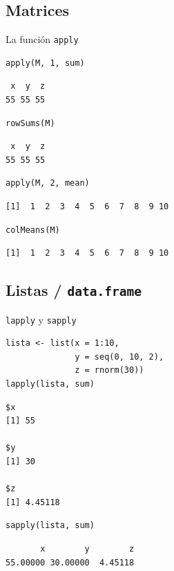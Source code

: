 \documentclass[xcolor={usenames,svgnames,dvipsnames}]{beamer}
\begin{document}
\subsection{Matrices}
\label{sec-4-1}
\begin{frame}[fragile,label=sec-4-1-1]{La función \texttt{apply}}
 \lstset{language=R,label= ,caption= ,numbers=none}
\begin{lstlisting}
apply(M, 1, sum)
\end{lstlisting}

\begin{verbatim}
 x  y  z 
55 55 55
\end{verbatim}

\lstset{language=R,label= ,caption= ,numbers=none}
\begin{lstlisting}
rowSums(M)
\end{lstlisting}

\begin{verbatim}
 x  y  z 
55 55 55
\end{verbatim}

\lstset{language=R,label= ,caption= ,numbers=none}
\begin{lstlisting}
apply(M, 2, mean)
\end{lstlisting}

\begin{verbatim}
[1]  1  2  3  4  5  6  7  8  9 10
\end{verbatim}

\lstset{language=R,label= ,caption= ,numbers=none}
\begin{lstlisting}
colMeans(M)
\end{lstlisting}

\begin{verbatim}
[1]  1  2  3  4  5  6  7  8  9 10
\end{verbatim}
\end{frame}

\subsection{Listas / \texttt{data.frame}}
\label{sec-4-2}
\begin{frame}[fragile,label=sec-4-2-1]{\texttt{lapply} y \texttt{sapply}}
 \lstset{language=R,label= ,caption= ,numbers=none}
\begin{lstlisting}
lista <- list(x = 1:10,
              y = seq(0, 10, 2),
              z = rnorm(30))
lapply(lista, sum)
\end{lstlisting}

\begin{verbatim}
$x
[1] 55

$y
[1] 30

$z
[1] 4.45118
\end{verbatim}

\lstset{language=R,label= ,caption= ,numbers=none}
\begin{lstlisting}
sapply(lista, sum)
\end{lstlisting}

\begin{verbatim}
       x        y        z 
55.00000 30.00000  4.45118
\end{verbatim}
\end{frame}
\end{document}
